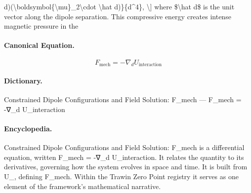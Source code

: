 d)(\textbackslash{}boldsymbol\{\textbackslash{}mu\}\_2\textbackslash{}cdot \textbackslash{}hat d)\}\{d\textasciicircum{}4\}, \textbackslash{}] where \$\textbackslash{}hat d\$ is the unit vector along the dipole separation. This compressive energy creates intense magnetic pressure in the

\paragraph{Canonical Equation.}
\[
F_{\mathrm{mech}} = -\nabla_d U_{\mathrm{interaction}}
\]

\paragraph{Dictionary.}
Constrained Dipole Configurations and Field Solution: F\_mech — F\_mech = -∇\_d U\_interaction

\paragraph{Encyclopedia.}
Constrained Dipole Configurations and Field Solution: F\_mech is a differential equation, written F\_mech = -∇\_d U\_interaction. It relates the quantity to its derivatives, governing how the system evolves in space and time. It is built from U\_, defining F\_mech. Within the Trawin Zero Point registry it serves as one element of the framework's mathematical narrative.
